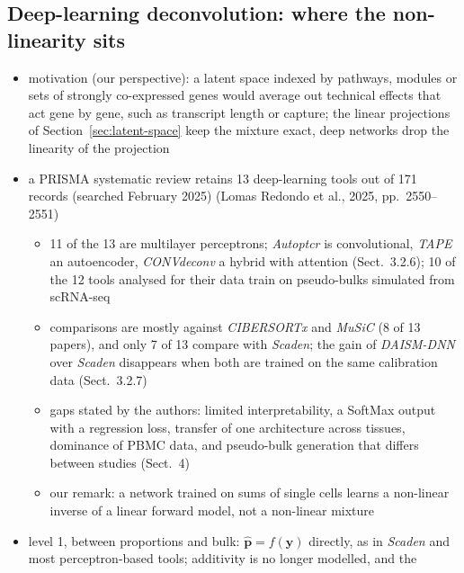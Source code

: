 \subsection{Deep-learning deconvolution: where the non-linearity sits}
\label{app:review-deep}

\begin{itemize}
  \item motivation (our perspective): a latent space indexed by pathways, modules or sets of strongly co-expressed
        genes would average out technical effects that act gene by gene, such as transcript length or capture; the
        linear projections of Section~\ref{sec:latent-space} keep the mixture exact, deep networks drop the linearity
        of the projection
  \item a PRISMA systematic review retains 13 deep-learning tools out of 171 records (searched February 2025)
        (Lomas Redondo et al., 2025, pp.~2550--2551)
  \begin{itemize}
    \item 11 of the 13 are multilayer perceptrons; \emph{Autoptcr} is convolutional, \emph{TAPE} an autoencoder,
          \emph{CONVdeconv} a hybrid with attention (Sect.~3.2.6); 10 of the 12 tools analysed for their data train
          on pseudo-bulks simulated from scRNA-seq
    \item comparisons are mostly against \emph{CIBERSORTx} and \emph{MuSiC} (8 of 13 papers), and only 7 of 13 compare
          with \emph{Scaden}; the gain of \emph{DAISM-DNN} over \emph{Scaden} disappears when both are trained on the
          same calibration data (Sect.~3.2.7)
    \item gaps stated by the authors: limited interpretability, a SoftMax output with a regression loss, transfer of
          one architecture across tissues, dominance of PBMC data, and pseudo-bulk generation that differs between
          studies (Sect.~4)
    \item our remark: a network trained on sums of single cells learns a non-linear inverse of a linear forward
          model, not a non-linear mixture
  \end{itemize}
  \item level 1, between proportions and bulk: \(\hat{\boldsymbol{p}}=f(\boldsymbol{y})\) directly, as in \emph{Scaden}
        \cite{mendenDeepLearningBased2020} and most perceptron-based tools; additivity is no longer modelled, and the

\end{itemize}
